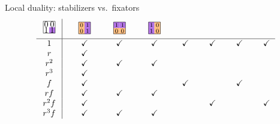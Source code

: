 \documentclass[8pt]{beamer}
\begin{document}
\begin{frame}{Local duality: stabilizers vs.\ fixators}
\[\begin{tabular}{c|cccccccccccccc}
\begin{tikzpicture}[scale=.5]
      \path[fill=actPurple] (.5,0) rectangle ++(.5,.5);
      \draw (0,0) rectangle (1,1);
      \draw (.25,.75) node{$0$}; \draw (.75,.75) node{$0$};
      \draw (.25,.25) node{$1$}; \draw (.75,.25) node{$1$};
    \end{tikzpicture}
    &&
    \begin{tikzpicture}[scale=.5]
      \tikzstyle{every node}=[font=\scriptsize]
      \path[fill=actOrange] (0,.5) rectangle ++(.5,.5); 
      \path[fill=actPurple] (.5,.5) rectangle ++(.5,.5);
      \path[fill=actOrange] (0,0) rectangle ++(.5,.5);
      \path[fill=actPurple] (.5,0) rectangle ++(.5,.5);
      \draw (0,0) rectangle (1,1);
      \draw (.25,.75) node{$0$}; \draw (.75,.75) node{$1$};
      \draw (.25,.25) node{$0$}; \draw (.75,.25) node{$1$};
    \end{tikzpicture}
    &&
    \begin{tikzpicture}[scale=.5]
      \tikzstyle{every node}=[font=\scriptsize]
      \path[fill=actPurple] (0,.5) rectangle ++(.5,.5); 
      \path[fill=actPurple] (.5,.5) rectangle ++(.5,.5);
      \path[fill=actOrange] (0,0) rectangle ++(.5,.5);
      \path[fill=actOrange] (.5,0) rectangle ++(.5,.5);
      \draw (0,0) rectangle (1,1);
      \draw (.25,.75) node{$1$}; \draw (.75,.75) node{$1$};
      \draw (.25,.25) node{$0$}; \draw (.75,.25) node{$0$};
    \end{tikzpicture}
    &&
    \begin{tikzpicture}[scale=.5]
      \tikzstyle{every node}=[font=\scriptsize]
      \path[fill=actPurple] (0,.5) rectangle ++(.5,.5); 
      \path[fill=actOrange] (.5,.5) rectangle ++(.5,.5);
      \path[fill=actPurple] (0,0) rectangle ++(.5,.5);
      \path[fill=actOrange] (.5,0) rectangle ++(.5,.5);
      \draw (0,0) rectangle (1,1);
      \draw (.25,.75) node{$1$}; \draw (.75,.75) node{$0$};
      \draw (.25,.25) node{$1$}; \draw (.75,.25) node{$0$};
    \end{tikzpicture}
    \\ 
    \hline $1$ && \checkmark && \checkmark && \checkmark && \checkmark && \checkmark && \checkmark && \checkmark  \\
    $r$ && \checkmark && && && && && && \\
    $r^2$ && \checkmark && \checkmark && \checkmark && && && && \\
    $r^3$ && \checkmark && && && && && && \\
    $f$ && \checkmark && && && \checkmark && && \checkmark && \\
    $rf$ && \checkmark && \checkmark && \checkmark && && && && \\
    $r^2f$ && \checkmark && && && && \checkmark && && \checkmark \\
    $r^3f$ && \checkmark && \checkmark && \checkmark && && && && 
  \end{tabular}
  \]
  

\end{frame}
\end{document}

